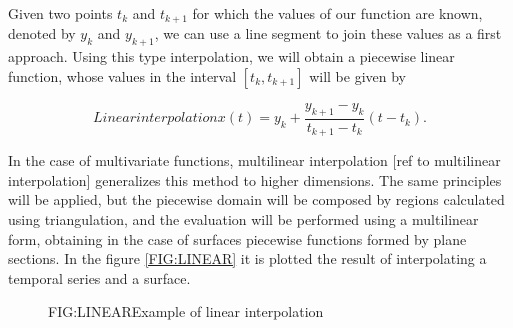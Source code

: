 
Given two points $t_k$ and $t_{k+1}$ for which the values of our function are
known, denoted by $y_k$ and $y_{k+1}$, we can use a line segment to join these
values as a first approach. Using this type interpolation, we will obtain a
piecewise linear function, whose values in the interval $[t_k, t_{k+1}]$ will
be given by

\begin{equation}[]{Linear interpolation}
 x(t)= y_{k}+\frac{y_{k+1}-y_{k}}{t_{k+1}-t_{k}}\left(t-t_{k}\right).
\end{equation}

In the case of multivariate functions, multilinear interpolation
[ref to multilinear interpolation] generalizes this method to higher dimensions.
The same principles will be applied, but the piecewise domain will be composed
by regions calculated using triangulation, and the evaluation will be performed
using a multilinear form, obtaining in the case of surfaces piecewise
functions formed by plane sections. In the figure \ref{FIG:LINEAR} it is plotted
the result of interpolating a temporal series and a surface.


\begin{figure}[Example of linear interpolation]{FIG:LINEAR}{Example of linear interpolation}
   \quad
\end{figure}
